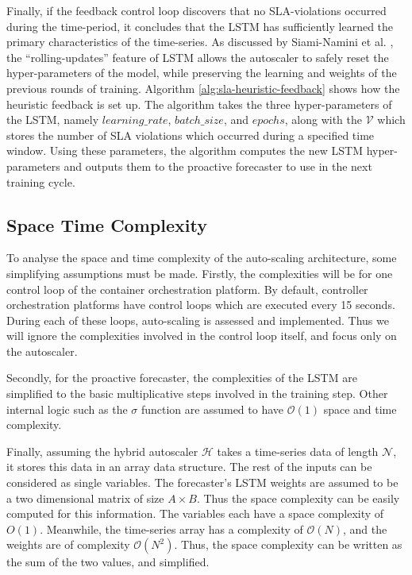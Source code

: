 Finally, if the feedback control loop discovers that no SLA-violations occurred during the time-period, it concludes that the LSTM has sufficiently learned the primary characteristics of the time-series. As discussed by Siami-Namini et al. \cite{siami2018comparison}, the ``rolling-updates'' feature of LSTM allows the autoscaler to safely reset the hyper-parameters of the model, while preserving the learning and weights of the previous rounds of training. Algorithm \ref{alg:sla-heuristic-feedback} shows how the heuristic feedback is set up. The algorithm takes the three hyper-parameters of the LSTM, namely $learning\_rate$, $batch\_size$, and $epochs$, along with the $\mathcal{V}$ which stores the number of SLA violations which occurred during a specified time window. Using these parameters, the algorithm computes the new LSTM hyper-parameters and outputs them to the proactive forecaster to use in the next training cycle.\par

\subsection{Space Time Complexity}
\label{subsec:ch3-space-time-comp}

To analyse the space and time complexity of the auto-scaling architecture, some simplifying assumptions must be made. Firstly, the complexities will be for one control loop of the container orchestration platform. By default, controller orchestration platforms have control loops which are executed every 15 seconds. During each of these loops, auto-scaling is assessed and implemented. Thus we will ignore the complexities involved in the control loop itself, and focus only on the autoscaler.\par

Secondly, for the proactive forecaster, the complexities of the LSTM are simplified to the basic multiplicative steps involved in the training step. Other internal logic such as the $\sigma$ function are assumed to have $\mathcal{O}(1)$ space and time complexity.\par

Finally, assuming the hybrid autoscaler $\mathcal{H}$ takes a time-series data of length $\mathcal{N}$, it stores this data in an array data structure. The rest of the inputs can be considered as single variables. The forecaster's LSTM weights are assumed to be a two dimensional matrix of size $A \times B$. Thus the space complexity can be easily computed for this information. The variables each have a space complexity of $O(1)$. Meanwhile, the time-series array has a complexity of $\mathcal{O}(N)$, and the weights are of complexity $\mathcal{O}(N^2)$. Thus, the space complexity can be written as the sum of the two values, and simplified.

